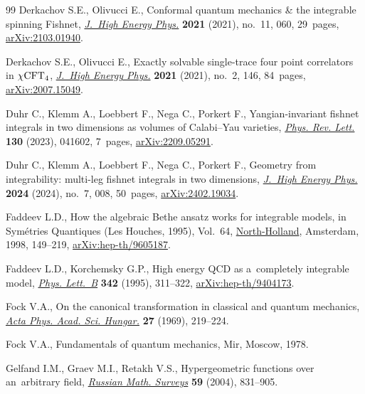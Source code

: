 \begin{thebibliography}{99}
Derkachov S.E., Olivucci E., Conformal quantum mechanics \& the integrable
 spinning {F}ishnet,
 \href{https://doi.org/10.1007/jhep11(2021)060}{\textit{J.~High Energy Phys.}}
 \textbf{2021} (2021), no.~11, 060, 29~pages,
 \href{http://arxiv.org/abs/2103.01940}{arXiv:2103.01940}.

Derkachov S.E., Olivucci E., Exactly solvable single-trace four point
 correlators in {$\chi {\rm CFT}_4$},
 \href{https://doi.org/10.1007/jhep02(2021)146}{\textit{J.~High Energy Phys.}}
 \textbf{2021} (2021), no.~2, 146, 84~pages,
 \href{http://arxiv.org/abs/2007.15049}{arXiv:2007.15049}.

Duhr C., Klemm A., Loebbert F., Nega C., Porkert F., Yangian-invariant fishnet
 integrals in two dimensions as volumes of {C}alabi--{Y}au varieties,
 \href{https://doi.org/10.1103/physrevlett.130.041602}{\textit{Phys. Rev.
 Lett.}} \textbf{130} (2023), 041602, 7~pages,
 \href{http://arxiv.org/abs/2209.05291}{arXiv:2209.05291}.

Duhr C., Klemm A., Loebbert F., Nega C., Porkert F., Geometry from
 integrability: multi-leg fishnet integrals in two dimensions,
 \href{https://doi.org/10.1007/jhep07(2024)008}{\textit{J.~High Energy Phys.}}
 \textbf{2024} (2024), no.~7, 008, 50~pages,
 \href{http://arxiv.org/abs/2402.19034}{arXiv:2402.19034}.

Faddeev L.D., How the algebraic {B}ethe ansatz works for integrable models, in
 Sym\'etries Quantiques ({L}es {H}ouches, 1995), Vol.~64,
 \href{https://doi.org/10.1007/jhep07(2024)008}{North-Holland}, Amsterdam,
 1998, 149--219,
 \href{http://arxiv.org/abs/hep-th/9605187}{arXiv:hep-th/9605187}.

Faddeev L.D., Korchemsky G.P., High energy {QCD} as a~completely integrable
 model, \href{https://doi.org/10.1016/0370-2693(94)01363-H}{\textit{Phys.
 Lett.~B}} \textbf{342} (1995), 311--322,
 \href{http://arxiv.org/abs/hep-th/9404173}{arXiv:hep-th/9404173}.

Fock V.A., On the canonical transformation in classical and quantum mechanics,
 \href{https://doi.org/10.1007/BF03156744}{\textit{Acta Phys. Acad. Sci.
 Hungar.}} \textbf{27} (1969), 219--224.

Fock V.A., Fundamentals of quantum mechanics, Mir, Moscow, 1978.

Gelfand I.M., Graev M.I., Retakh V.S., Hypergeometric functions over
 an~arbitrary field,
 \href{https://doi.org/10.1070/RM2004v059n05ABEH000771}{\textit{Russian Math.
 Surveys}} \textbf{59} (2004), 831--905.


\end{thebibliography}
